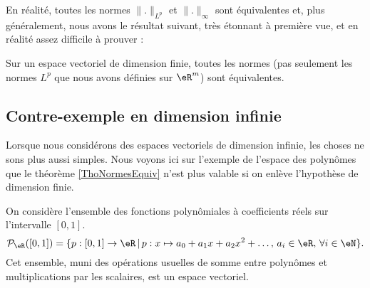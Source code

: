 En réalité, toutes les normes \( \| . \|_{L^p}\) et \( \| . \|_{\infty}\) sont équivalentes et, plus généralement, nous avons le résultat suivant, très étonnant à première vue, et en réalité assez difficile à prouver :
\begin{theorem}		\label{ThoNormesEquiv}
	Sur un espace vectoriel de dimension finie, toutes les normes (pas seulement les normes $L^p$ que nous avons définies sur $\eR^m$) sont équivalentes.
\end{theorem}

\subsection{Contre-exemple en dimension infinie}
\label{SubSecPOlynomesCE}

Lorsque nous considérons des espaces vectoriels de dimension infinie, les choses ne sons plus aussi simples. Nous voyons ici sur l'exemple de l'espace des polynômes que le théorème \ref{ThoNormesEquiv} n'est plus valable si on enlève l'hypothèse de dimension finie.

On considère l'ensemble des fonctions polynômiales à coefficients réels sur  l'intervalle $[0,1]$.
\begin{equation}
\mathcal{P}_\eR([0,1])=\{p:[0,1]\to \eR\,|\, p : x\mapsto a_0+a_1 x +a_2 x^2 + \ldots, \, a_i\in\eR,\,\forall i\in \eN\}.
\end{equation}
Cet ensemble, muni des opérations usuelles de somme entre polynômes et multiplications par les scalaires, est un espace vectoriel.  

